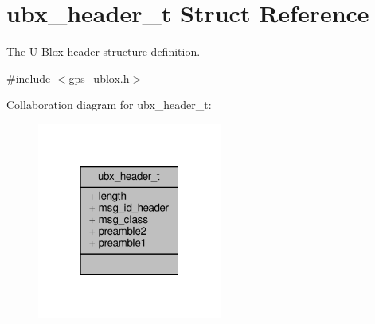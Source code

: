 \hypertarget{structubx__header__t}{\section{ubx\+\_\+header\+\_\+t Struct Reference}
\label{structubx__header__t}
}


The U-\/\+Blox header structure definition.  




{\ttfamily \#include $<$gps\+\_\+ublox.\+h$>$}



Collaboration diagram for ubx\+\_\+header\+\_\+t\+:
\nopagebreak
\begin{figure}[H]
\begin{center}
\leavevmode
\includegraphics[width=172pt]{structubx__header__t__coll__graph}
\end{center}
\end{figure}
